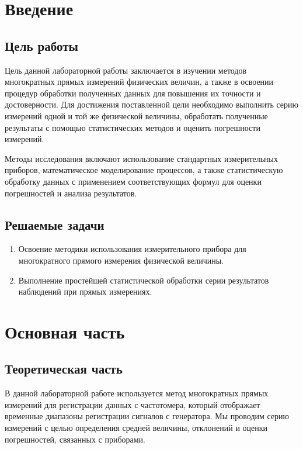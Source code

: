 

\section{Введение}


\subsection{Цель работы}

Цель данной лабораторной работы заключается в изучении методов многократных прямых измерений физических величин, а также в освоении процедур обработки полученных данных для повышения их точности и достоверности. Для достижения поставленной цели необходимо выполнить серию измерений одной и той же физической величины, обработать полученные результаты с помощью статистических методов и оценить погрешности измерений.

Методы исследования включают использование стандартных измерительных приборов, математическое моделирование процессов, а также статистическую обработку данных с применением соответствующих формул для оценки погрешностей и анализа результатов.


\subsection{Решаемые задачи}
\begin{enumerate}
  \item Освоение методики использования измерительного прибора для
многократного прямого измерения физической величины.
  \item Выполнение простейшей статистической обработки серии
результатов наблюдений при прямых измерениях.
\end{enumerate}

\section{Основная часть}

\subsection{Теоретическая часть}

В данной лабораторной работе используется метод многократных прямых измерений для регистрации данных с частотомера, который отображает временные диапазоны регистрации сигналов с генератора. Мы проводим серию измерений с целью определения средней величины, отклонений и оценки погрешностей, связанных с приборами.

